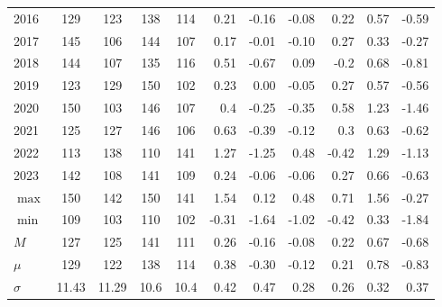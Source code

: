\documentclass{article}
\begin{document}
\begin{table}[!ht]
\begin{tabular}{l| cc | cc || rrrr|rr}
        2016 & 129 & 123 & 138 & 114 & 0.21 & -0.16 & -0.08 & 0.22 & 0.57 & -0.59 \\ 
        2017 & 145 & 106 & 144 & 107 & 0.17 & -0.01 & -0.10 & 0.27 & 0.33 & -0.27 \\ 
        2018 & 144 & 107 & 135 & 116 & 0.51 & -0.67 & 0.09 & -0.2 & 0.68 & -0.81 \\ 
        2019 & 123 & 129 & 150 & 102 & 0.23 & 0.00 & -0.05 & 0.27 & 0.57 & -0.56 \\ 
        2020 & 150 & 103 & 146 & 107 & 0.4 & -0.25 & -0.35 & 0.58 & 1.23 & -1.46 \\ 
        2021 & 125 & 127 & 146 & 106 & 0.63 & -0.39 & -0.12 & 0.3 & 0.63 & -0.62 \\ 
        2022 & 113 & 138 & 110 & 141 & 1.27 & -1.25 & 0.48 & -0.42 & 1.29 & -1.13 \\ 
        2023 & 142 & 108 & 141 & 109 & 0.24 & -0.06 & -0.06 & 0.27 & 0.66 & -0.63 \\  \hline
        $\max$ & 150 & 142 & 150 & 141 & 1.54 & 0.12 & 0.48 & 0.71 & 1.56 & -0.27 \\ 
        $\min$ & 109 & 103 & 110 & 102 & -0.31 & -1.64 & -1.02 & -0.42 & 0.33 & -1.84 \\ 
        $M$ & 127 & 125 & 141 & 111 & 0.26 & -0.16 & -0.08 & 0.22 & 0.67 & -0.68 \\ 
        $\mu$ & 129 & 122 & 138 & 114 & 0.38 & -0.30 & -0.12 & 0.21 & 0.78 & -0.83 \\ 
        $\sigma$ & 11.43 & 11.29 & 10.6 & 10.4 & 0.42 & 0.47 & 0.28 & 0.26 & 0.32 & 0.37 \\ 
        \hline
    \end{tabular}
    \label{tab:comparison_ml_metrics}
\end{table}
\end{document}
